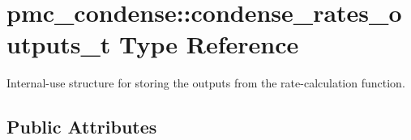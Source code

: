 \hypertarget{structpmc__condense_1_1condense__rates__outputs__t}{}\section{pmc\+\_\+condense\+:\+:condense\+\_\+rates\+\_\+outputs\+\_\+t Type Reference}
\label{structpmc__condense_1_1condense__rates__outputs__t}


Internal-\/use structure for storing the outputs from the rate-\/calculation function.  


\subsection*{Public Attributes}
